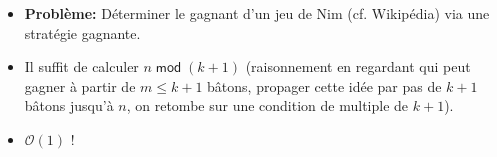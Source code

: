 \begin{frame}
    \frametitle{\problemtitle}
    \begin{itemize}
        \item<+-> \textbf{Problème:} Déterminer le gagnant d'un jeu de Nim (cf. Wikipédia) via une stratégie gagnante.
        \item<+-> Il suffit de calculer $n\;\mathsf{mod}\; (k + 1)$ (raisonnement en regardant qui peut gagner à partir de $m \le k+1$ bâtons, propager cette idée par pas de $k+1$ bâtons jusqu'à $n$, on retombe sur une condition de multiple de $k+1$).
        \item<+-> $\mathcal O(1)$ !
    \end{itemize}
\end{frame}
